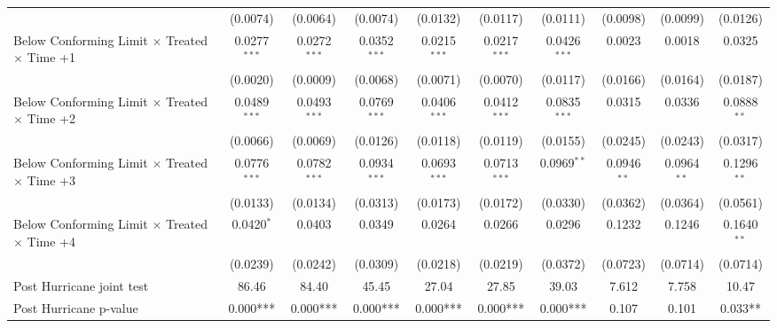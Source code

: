 \begin{tabular}{lccccccccc}
                                                              & (0.0074)       & (0.0064)       & (0.0074)       & (0.0132)       & (0.0117)       & (0.0111)       & (0.0098)      & (0.0099)      & (0.0126)\\   
   Below Conforming Limit $\times$ Treated $\times$ Time +1   & 0.0277$^{***}$ & 0.0272$^{***}$ & 0.0352$^{***}$ & 0.0215$^{***}$ & 0.0217$^{***}$ & 0.0426$^{***}$ & 0.0023        & 0.0018        & 0.0325\\   
                                                              & (0.0020)       & (0.0009)       & (0.0068)       & (0.0071)       & (0.0070)       & (0.0117)       & (0.0166)      & (0.0164)      & (0.0187)\\   
   Below Conforming Limit $\times$ Treated $\times$ Time +2   & 0.0489$^{***}$ & 0.0493$^{***}$ & 0.0769$^{***}$ & 0.0406$^{***}$ & 0.0412$^{***}$ & 0.0835$^{***}$ & 0.0315        & 0.0336        & 0.0888$^{**}$\\   
                                                              & (0.0066)       & (0.0069)       & (0.0126)       & (0.0118)       & (0.0119)       & (0.0155)       & (0.0245)      & (0.0243)      & (0.0317)\\   
   Below Conforming Limit $\times$ Treated $\times$ Time +3   & 0.0776$^{***}$ & 0.0782$^{***}$ & 0.0934$^{***}$ & 0.0693$^{***}$ & 0.0713$^{***}$ & 0.0969$^{**}$  & 0.0946$^{**}$ & 0.0964$^{**}$ & 0.1296$^{**}$\\   
                                                              & (0.0133)       & (0.0134)       & (0.0313)       & (0.0173)       & (0.0172)       & (0.0330)       & (0.0362)      & (0.0364)      & (0.0561)\\   
   Below Conforming Limit $\times$ Treated $\times$ Time +4   & 0.0420$^{*}$   & 0.0403         & 0.0349         & 0.0264         & 0.0266         & 0.0296         & 0.1232        & 0.1246        & 0.1640$^{**}$\\   
                                                              & (0.0239)       & (0.0242)       & (0.0309)       & (0.0218)       & (0.0219)       & (0.0372)       & (0.0723)      & (0.0714)      & (0.0714)\\   
   Post Hurricane joint test                                  & 86.46          & 84.40          & 45.45          & 27.04          & 27.85          & 39.03          & 7.612         & 7.758         & 10.47\\  
   Post Hurricane p-value                                     & 0.000***       & 0.000***       & 0.000***       & 0.000***       & 0.000***       & 0.000***       & 0.107         & 0.101         & 0.033**\\  

\end{tabular}
